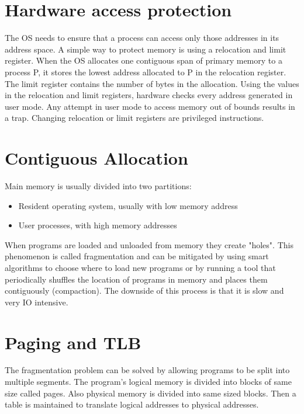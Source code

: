 
\section{Hardware access protection}
The OS needs to ensure that a process can access only those addresses in its address space. A simple way to protect memory is using a relocation and limit register. When the OS allocates one contiguous span of primary memory to a process P, it stores the lowest address allocated to P in the relocation register. The limit register contains the number of bytes in the allocation. Using the values in the relocation and limit registers, hardware checks every address generated in user mode. Any attempt in user mode to access memory out of bounds results in a trap. Changing relocation or limit registers are privileged instructions.


\section{Contiguous Allocation}
Main memory is usually divided into two partitions:
\begin{itemize}
    \item Resident operating system, usually with low memory address
    \item User processes, with high memory addresses
\end{itemize}
When programs are loaded and unloaded from memory they create "holes". This phenomenon is called fragmentation and can be mitigated by using smart algorithms to choose where to load new programs or by running a tool that periodically shuffles the location of programs in memory and places them contiguously (compaction). The downside of this process is that it is slow and very IO intensive.


\section{Paging and TLB}
The fragmentation problem can be solved by allowing programs to be split into multiple segments. The program's logical memory is divided into blocks of same size called pages. Also physical memory is divided into same sized blocks. Then a table is maintained to translate logical addresses to physical addresses.

